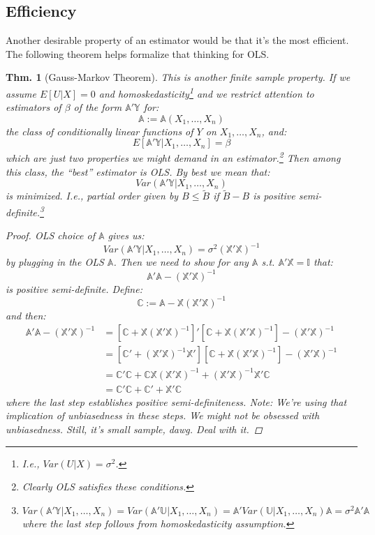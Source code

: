 \documentclass{tufte-book}
\theoremstyle{mytheoremstyle}
\newtheorem*{thm}{Thm.}
\theoremstyle{mylemstyle}
\theoremstyle{mydefstyle}
\begin{document}
\subsection{Efficiency} Another desirable property of an estimator would be that it's the most efficient. The following theorem helps formalize that thinking for OLS.
\begin{thm}[Gauss-Markov Theorem] This is another finite sample property. If we assume \(E[U|X] = 0\) and homoskedasticity\footnote{I.e., \(Var(U|X) = \sigma^2\).} and we restrict attention to estimators of \(\beta\) of the form \(\mathbb{A}'\mathbb{Y}\) for:
	\[\mathbb{A} := \mathbb{A}(X_1, \dots, X_n)\]
the class of conditionally linear functions of \(Y\) on \(X_1, \dots, X_n\), and:
	\[E[\mathbb{A}'\mathbb{Y} | X_1, \dots, X_n] = \beta\]
which are just two properties we might demand in an estimator.\footnote{Clearly OLS satisfies these conditions.} Then among this class, the ``best'' estimator is OLS. By best we mean that:
	\[Var(\mathbb{A}'\mathbb{Y}|X_1, \dots, X_n)\]
is minimized. I.e., partial order given by \(B \le \tilde{B}\) if \(\tilde{B} - B\) is positive semi-definite.\footnote{\(Var(\mathbb{A}'\mathbb{Y}|X_1, \dots, X_n) = Var(\mathbb{A}'\mathbb{U}|X_1, \dots, X_n) = \mathbb{A}'Var(\mathbb{U}|X_1, \dots, X_n)\mathbb{A} = \sigma^2\mathbb{A}'\mathbb{A}\) where the last step follows from homoskedasticity assumption.}
	\begin{proof} OLS choice of \(\mathbb{A}\) gives us:
			\[Var(\mathbb{A}'\mathbb{Y}|X_1, \dots, X_n) = \sigma^2(\mathbb{X}'\mathbb{X})^{-1}\]
		by plugging in the OLS \(\mathbb{A}\). Then we need to show for any \(\mathbb{A}\) s.t. \(\mathbb{A}'\mathbb{X} = \mathbb{I}\) that:
			\[\mathbb{A}'\mathbb{A} - (\mathbb{X}'\mathbb{X})^{-1}\]
		is positive semi-definite. Define:
			\[\mathbb{C} := \mathbb{A} - \mathbb{X}(\mathbb{X}'\mathbb{X})^{-1}\]
		and then:
			\begin{align*}
				\mathbb{A}'\mathbb{A} - (\mathbb{X}'\mathbb{X})^{-1} & = [\mathbb{C} + \mathbb{X}(\mathbb{X}'\mathbb{X})^{-1}]' [\mathbb{C} + \mathbb{X}(\mathbb{X}'\mathbb{X})^{-1}] - (\mathbb{X}'\mathbb{X})^{-1} \\
															& = [\mathbb{C}' + (\mathbb{X}'\mathbb{X})^{-1}\mathbb{X}'][\mathbb{C} + \mathbb{X}(\mathbb{X}'\mathbb{X})^{-1}] - (\mathbb{X}'\mathbb{X})^{-1} \\
															& = \mathbb{C}'\mathbb{C} + \mathbb{C}\mathbb{X}(\mathbb{X}'\mathbb{X})^{-1} + (\mathbb{X}'\mathbb{X})^{-1}\mathbb{X}'\mathbb{C} \\
															& = \mathbb{C}'\mathbb{C} + \mathbb{C}' + \mathbb{X}'\mathbb{C}
			\end{align*}
		where the last step establishes positive semi-definiteness. Note: We're using that implication of unbiasedness in these steps. We might not be obsessed with unbiasedness. Still, it's small sample, dawg. Deal with it.
	\end{proof}
\end{thm}
\end{document}
